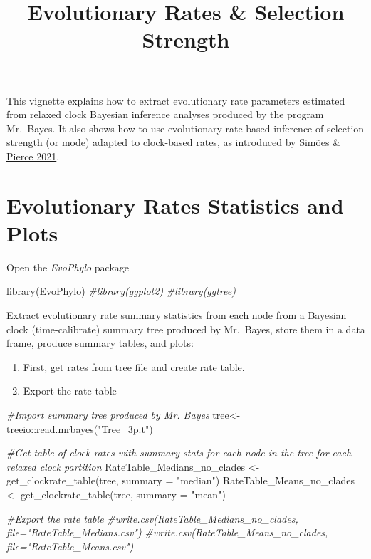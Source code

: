 \documentclass[
]{article}
\title{Evolutionary Rates \& Selection Strength}
\author{}
\date{\vspace{-2.5em}}
\newenvironment{Shaded}{\begin{snugshade}}{\end{snugshade}}
\newcommand{\AttributeTok}[1]{\textcolor[rgb]{0.77,0.63,0.00}{#1}}
\newcommand{\CommentTok}[1]{\textcolor[rgb]{0.56,0.35,0.01}{\textit{#1}}}
\newcommand{\FunctionTok}[1]{\textcolor[rgb]{0.00,0.00,0.00}{#1}}
\newcommand{\NormalTok}[1]{#1}
\newcommand{\OtherTok}[1]{\textcolor[rgb]{0.56,0.35,0.01}{#1}}
\newcommand{\SpecialCharTok}[1]{\textcolor[rgb]{0.00,0.00,0.00}{#1}}
\newcommand{\StringTok}[1]{\textcolor[rgb]{0.31,0.60,0.02}{#1}}
\providecommand{\tightlist}{%
  \setlength{\itemsep}{0pt}\setlength{\parskip}{0pt}}
\begin{document}
\maketitle

This vignette explains how to extract evolutionary rate parameters
estimated from relaxed clock Bayesian inference analyses produced by the
program Mr.~Bayes. It also shows how to use evolutionary rate based
inference of selection strength (or mode) adapted to clock-based rates,
as introduced by
\href{https://www.nature.com/articles/s41559-021-01532-x}{Simões \&
Pierce 2021}.

\hypertarget{evolutionary-rates-statistics-and-plots}{%
\section{Evolutionary Rates Statistics and
Plots}\label{evolutionary-rates-statistics-and-plots}}

Open the \emph{EvoPhylo} package

\begin{Shaded}
\begin{Highlighting}[]
\FunctionTok{library}\NormalTok{(EvoPhylo)}
\CommentTok{\#library(ggplot2)}
\CommentTok{\#library(ggtree)}
\end{Highlighting}
\end{Shaded}

Extract evolutionary rate summary statistics from each node from a
Bayesian clock (time-calibrate) summary tree produced by Mr.~Bayes,
store them in a data frame, produce summary tables, and plots:

\begin{enumerate}
\def\labelenumi{\arabic{enumi}.}
\tightlist
\item
  First, get rates from tree file and create rate table.
\item
  Export the rate table
\end{enumerate}

\begin{Shaded}
\begin{Highlighting}[]
\CommentTok{\#Import summary tree produced by Mr. Bayes}
\NormalTok{tree}\OtherTok{\textless{}{-}}\NormalTok{treeio}\SpecialCharTok{::}\FunctionTok{read.mrbayes}\NormalTok{(}\StringTok{"Tree\_3p.t"}\NormalTok{)}

\CommentTok{\#Get table of clock rates with summary stats for each node in the tree for each relaxed clock partition }
\NormalTok{RateTable\_Medians\_no\_clades }\OtherTok{\textless{}{-}} \FunctionTok{get\_clockrate\_table}\NormalTok{(tree, }\AttributeTok{summary =} \StringTok{"median"}\NormalTok{)}
\NormalTok{RateTable\_Means\_no\_clades }\OtherTok{\textless{}{-}} \FunctionTok{get\_clockrate\_table}\NormalTok{(tree, }\AttributeTok{summary =} \StringTok{"mean"}\NormalTok{)}

\CommentTok{\#Export the rate table}
\CommentTok{\#write.csv(RateTable\_Medians\_no\_clades, file="RateTable\_Medians.csv")}
\CommentTok{\#write.csv(RateTable\_Means\_no\_clades, file="RateTable\_Means.csv")}
\end{Highlighting}
\end{Shaded}
\end{document}
